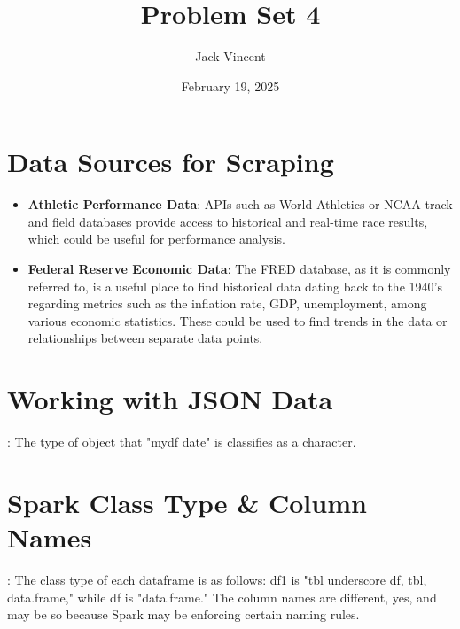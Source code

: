 \documentclass{article}
\title{Problem Set 4}
\author{Jack Vincent}
\date{February 19, 2025}
\begin{document}
\maketitle

\section{Data Sources for Scraping}
\begin{itemize}
\item \textbf{Athletic Performance Data}: APIs such as World Athletics or NCAA track and field databases provide access to historical and real-time race results, which could be useful for performance analysis.
\item \textbf{Federal Reserve Economic Data}: The FRED database, as it is commonly referred to, is a useful place to find historical data dating back to the 1940's regarding metrics such as the inflation rate, GDP, unemployment, among various economic statistics. These could be used to find trends in the data or relationships between separate data points.
\end{itemize}

\section{Working with JSON Data}: The type of object that "mydf date" is classifies as a character.    

\section{Spark Class Type \& Column Names}: The class type of each dataframe is as follows: df1 is "tbl underscore df, tbl, data.frame," while df is "data.frame." The column names are different, yes, and may be so because Spark may be enforcing certain naming rules.
\end{document}
